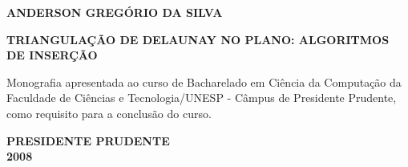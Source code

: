 \thispagestyle{empty}
\vspace{20mm}

\begin{center}
\large \bf{ANDERSON GREG\'ORIO DA SILVA}

\vspace{80mm}

\large \bf{TRIANGULA\c{C}\~{A}O DE DELAUNAY NO PLANO: ALGORITMOS DE INSER\c{C}\~{A}O}
\end{center}
\vspace{5mm}
\hspace{50mm}
\begin{minipage}{100mm}
Monografia apresentada ao curso de Bacharelado em Ci\^{e}ncia da Computa\c{c}\~{a}o da Faculdade de Ci\^{e}ncias e Tecnologia/UNESP - C\^{a}mpus de Presidente Prudente, como requisito para a conclus\~{a}o do curso.
\end{minipage}
\vspace{80mm}
\begin{center}
\textbf{PRESIDENTE PRUDENTE \\ 2008} 
\end{center}
\newpage